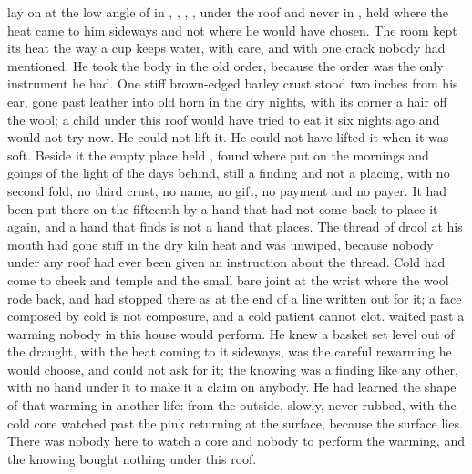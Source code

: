  lay on  at the low angle of  in , , , , under the roof and never in , held where the heat came to him sideways and not where he would have chosen. The room kept its heat the way a cup keeps water, with care, and with one crack nobody had mentioned. He took the body in the old order, because the order was the only instrument he had. One stiff brown-edged barley crust stood two inches from his ear, gone past leather into old horn in the dry nights, with its corner a hair off the wool; a child under this roof would have tried to eat it six nights ago and would not try now. He could not lift it. He could not have lifted it when it was soft. Beside it the empty place held , found where put on the mornings and goings of the light of the days behind, still a finding and not a placing, with no second fold, no third crust, no name, no gift, no payment and no payer. It had been put there on the fifteenth by a hand that had not come back to place it again, and a hand that finds is not a hand that places. The thread of drool at his mouth had gone stiff in the dry kiln heat and was unwiped, because nobody under any roof had ever been given an instruction about the thread. Cold had come to cheek and temple and the small bare joint at the wrist where the wool rode back, and had stopped there as at the end of a line written out for it; a face composed by cold is not composure, and a cold patient cannot clot.  waited past a warming nobody in this house would perform. He knew a basket set level out of the draught, with the heat coming to it sideways, was the careful rewarming he would choose, and could not ask for it; the knowing was a finding like any other, with no hand under it to make it a claim on anybody. He had learned the shape of that warming in another life: from the outside, slowly, never rubbed, with the cold core watched past the pink returning at the surface, because the surface lies. There was nobody here to watch a core and nobody to perform the warming, and the knowing bought nothing under this roof.

